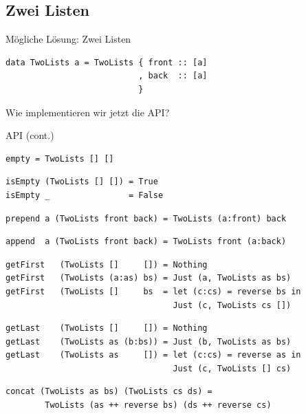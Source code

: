 \documentclass{beamer}
\begin{document}
\subsection{Zwei Listen}

\begin{frame}[fragile]
Mögliche Lösung: Zwei Listen\bigskip

\begin{verbatim}
data TwoLists a = TwoLists { front :: [a]
                           , back  :: [a]
                           }
\end{verbatim}
\pause\bigskip

Wie implementieren wir jetzt die API?
\end{frame}

\begin{frame}[fragile]
API (cont.)

\begin{verbatim}
empty = TwoLists [] []
\end{verbatim}
\pause
\begin{verbatim}
isEmpty (TwoLists [] []) = True
isEmpty _                = False
\end{verbatim}
\pause
\begin{verbatim}
prepend a (TwoLists front back) = TwoLists (a:front) back
\end{verbatim}
\pause
\begin{verbatim}
append  a (TwoLists front back) = TwoLists front (a:back)
\end{verbatim}
\end{frame}

\begin{frame}[fragile]
\begin{verbatim}
getFirst   (TwoLists []     []) = Nothing
getFirst   (TwoLists (a:as) bs) = Just (a, TwoLists as bs)
getFirst   (TwoLists []     bs  = let (c:cs) = reverse bs in
                                  Just (c, TwoLists cs [])
\end{verbatim}
\pause
\begin{verbatim}
getLast    (TwoLists []     []) = Nothing
getLast    (TwoLists as (b:bs)) = Just (b, TwoLists as bs)
getLast    (TwoLists as     []) = let (c:cs) = reverse as in
                                  Just (c, TwoLists [] cs)
\end{verbatim}
\pause
\begin{verbatim}
concat (TwoLists as bs) (TwoLists cs ds) =
        TwoLists (as ++ reverse bs) (ds ++ reverse cs)
\end{verbatim}
\end{frame}
\end{document}

